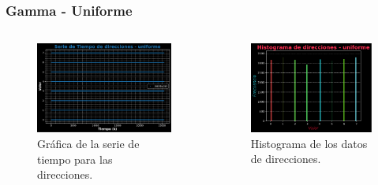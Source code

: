 \begin{frame}
	\frametitle{Gamma - Uniforme}
	
	\begin{columns}
		
		\begin{column}{0.5\textwidth} %
			\begin{figure}
				\centering
				\includegraphics[width=\textwidth]{graf_direcciones_uniforme} %
				\caption{Gráfica de la serie de tiempo para las direcciones.}
			\end{figure}
		\end{column}
		
		\begin{column}{0.5\textwidth} %
			\begin{figure}
				\centering
				\includegraphics[width=\textwidth]{hist_direcciones_uniforme} %
				\caption{Histograma de los datos de direcciones.}
			\end{figure}
		\end{column}
	\end{columns}
\end{frame}


